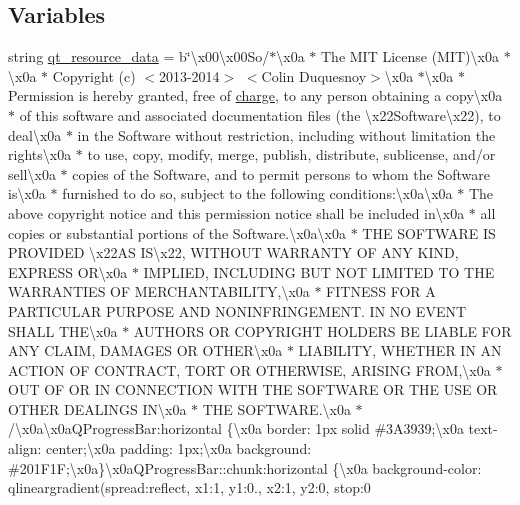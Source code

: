 \subsection*{Variables}
\begin{DoxyCompactItemize}
\item 
string \hyperlink{namespaceqdarkstyle_1_1pyside__style__rc_a5a24d4082e5df943e82ae386bf70c071}{qt\+\_\+resource\+\_\+data} = b\char`\"{}\textbackslash{}x00\textbackslash{}x00\+So/$\ast$\textbackslash{}x0a $\ast$ The M\+I\+T License (M\+I\+T)\textbackslash{}x0a $\ast$\textbackslash{}x0a $\ast$ Copyright (c) $<$2013-\/2014$>$ $<$Colin Duquesnoy$>$\textbackslash{}x0a $\ast$\textbackslash{}x0a $\ast$ Permission is hereby granted, free of \hyperlink{cache_8cc_a7476acc4f60747f9d9032e9cbdf5eb79}{charge}, to any person obtaining a copy\textbackslash{}x0a $\ast$ of this software and associated documentation files (the \textbackslash{}x22\+Software\textbackslash{}x22), to deal\textbackslash{}x0a $\ast$ in the Software without restriction, including without limitation the rights\textbackslash{}x0a $\ast$ to use, copy, modify, merge, publish, distribute, sublicense, and/or sell\textbackslash{}x0a $\ast$ copies of the Software, and to permit persons to whom the Software is\textbackslash{}x0a $\ast$ furnished to do so, subject to the following conditions\+:\textbackslash{}x0a\textbackslash{}x0a $\ast$ The above copyright notice and this permission notice shall be included in\textbackslash{}x0a $\ast$ all copies or substantial portions of the Software.\textbackslash{}x0a\textbackslash{}x0a $\ast$ T\+H\+E S\+O\+F\+T\+W\+A\+R\+E I\+S P\+R\+O\+V\+I\+D\+E\+D \textbackslash{}x22\+A\+S I\+S\textbackslash{}x22, W\+I\+T\+H\+O\+U\+T W\+A\+R\+R\+A\+N\+T\+Y O\+F A\+N\+Y K\+I\+N\+D, E\+X\+P\+R\+E\+S\+S O\+R\textbackslash{}x0a $\ast$ I\+M\+P\+L\+I\+E\+D, I\+N\+C\+L\+U\+D\+I\+N\+G B\+U\+T N\+O\+T L\+I\+M\+I\+T\+E\+D T\+O T\+H\+E W\+A\+R\+R\+A\+N\+T\+I\+E\+S O\+F M\+E\+R\+C\+H\+A\+N\+T\+A\+B\+I\+L\+I\+T\+Y,\textbackslash{}x0a $\ast$ F\+I\+T\+N\+E\+S\+S F\+O\+R A P\+A\+R\+T\+I\+C\+U\+L\+A\+R P\+U\+R\+P\+O\+S\+E A\+N\+D N\+O\+N\+I\+N\+F\+R\+I\+N\+G\+E\+M\+E\+N\+T. I\+N N\+O E\+V\+E\+N\+T S\+H\+A\+L\+L T\+H\+E\textbackslash{}x0a $\ast$ A\+U\+T\+H\+O\+R\+S O\+R C\+O\+P\+Y\+R\+I\+G\+H\+T H\+O\+L\+D\+E\+R\+S B\+E L\+I\+A\+B\+L\+E F\+O\+R A\+N\+Y C\+L\+A\+I\+M, D\+A\+M\+A\+G\+E\+S O\+R O\+T\+H\+E\+R\textbackslash{}x0a $\ast$ L\+I\+A\+B\+I\+L\+I\+T\+Y, W\+H\+E\+T\+H\+E\+R I\+N A\+N A\+C\+T\+I\+O\+N O\+F C\+O\+N\+T\+R\+A\+C\+T, T\+O\+R\+T O\+R O\+T\+H\+E\+R\+W\+I\+S\+E, A\+R\+I\+S\+I\+N\+G F\+R\+O\+M,\textbackslash{}x0a $\ast$ O\+U\+T O\+F O\+R I\+N C\+O\+N\+N\+E\+C\+T\+I\+O\+N W\+I\+T\+H T\+H\+E S\+O\+F\+T\+W\+A\+R\+E O\+R T\+H\+E U\+S\+E O\+R O\+T\+H\+E\+R D\+E\+A\+L\+I\+N\+G\+S I\+N\textbackslash{}x0a $\ast$ T\+H\+E S\+O\+F\+T\+W\+A\+R\+E.\textbackslash{}x0a $\ast$/\textbackslash{}x0a\textbackslash{}x0a\+Q\+Progress\+Bar\+:horizontal \{\textbackslash{}x0a border\+: 1px solid \#3\+A3939;\textbackslash{}x0a text-\/align\+: center;\textbackslash{}x0a padding\+: 1px;\textbackslash{}x0a background\+: \#201\+F1\+F;\textbackslash{}x0a\}\textbackslash{}x0a\+Q\+Progress\+Bar\+::chunk\+:horizontal \{\textbackslash{}x0a background-\/color\+: qlineargradient(spread\+:reflect, x1\+:1, y1\+:0., x2\+:1, y2\+:0, stop\+:0 
\end{DoxyCompactItemize}
